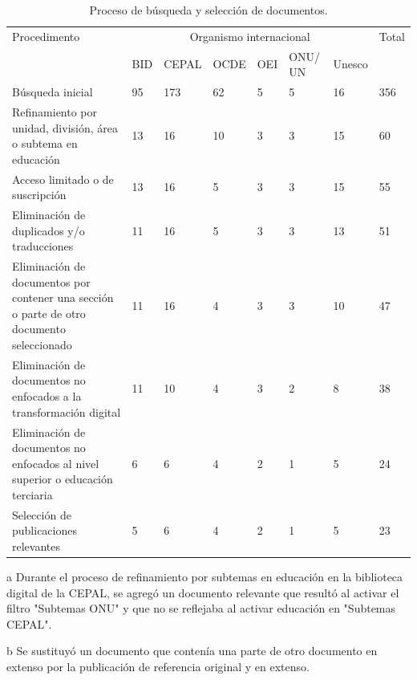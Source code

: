     
\begin{table}[htpb]
\centering
\small
\begin{threeparttable}
\caption{Proceso de búsqueda y selección de documentos.}
\label{tab-04}
\begin{tabular}{
>{\raggedright\arraybackslash}p{}
*{7}{l}
}
\toprule
Procedimento & \multicolumn{6}{c}{Organismo internacional} & Total \\
        & BID & CEPAL & OCDE & OEI & ONU/ UN & Unesco & \\
\midrule
        Búsqueda inicial & 95 & 173 & 62 & 5 & 5 & 16 & 356 \\
        Refinamiento por unidad, división, área o subtema en educación
        & 13 & 16\tnote{a} & 10 & 3 & 3 & 15 & 60 \\
        Acceso limitado o de suscripción & 13 & 16 & 5 & 3 & 3 & 15 &
        55 \\
        Eliminación de duplicados y/o traducciones & 11 & 16 & 5 & 3 &
        3 & 13 & 51 \\
        Eliminación de documentos por contener una sección o parte de otro documento seleccionado & 11 & 16\tnote{b} & 4 & 3 & 3 & 10 &
        47 \\
        Eliminación de documentos no enfocados a la transformación digital & 11 & 10 & 4 & 3 & 2 & 8 & 38 \\
        Eliminación de documentos no enfocados al nivel superior o educación terciaria & 6 & 6 & 4 & 2 & 1 & 5 & 24 \\
        Selección de publicaciones relevantes & 5 & 6
        & 4 & 2 & 1 & 5 & 23 \\
        \bottomrule
    \end{tabular}
    \begin{tablenotes}
    \small {
    \item[a]{Durante el proceso de refinamiento por subtemas en educación en la biblioteca digital de la CEPAL, se agregó un documento relevante que resultó al activar el filtro "Subtemas ONU" y que no se reflejaba al activar educación en "Subtemas CEPAL".}
    \item[b]{Se sustituyó un documento que contenía una parte de otro documento en extenso por la publicación de referencia original y en extenso.}
    }
    \end{tablenotes}
    \end{threeparttable}
\end{table}


